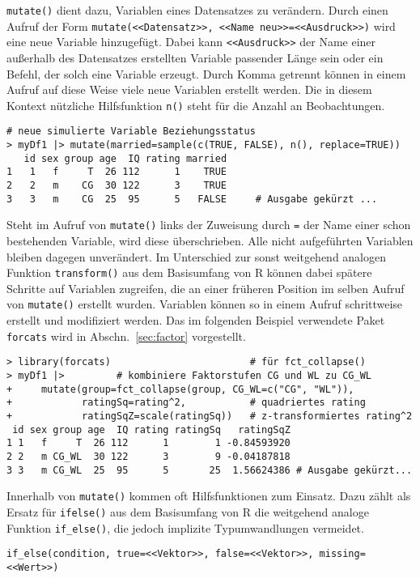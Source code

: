 \lstinline!mutate()! dient dazu, Variablen eines Datensatzes zu verändern. Durch einen Aufruf der Form \lstinline!mutate(<<Datensatz>>, <<Name neu>>=<<Ausdruck>>)! wird eine neue Variable hinzugefügt. Dabei kann \lstinline!<<Ausdruck>>! der Name einer außerhalb des Datensatzes erstellten Variable passender Länge sein oder ein Befehl, der solch eine Variable erzeugt. Durch Komma getrennt können in einem Aufruf auf diese Weise viele neue Variablen erstellt werden. Die in diesem Kontext nützliche Hilfsfunktion \lstinline!n()! steht für die Anzahl an Beobachtungen.
\begin{lstlisting}
# neue simulierte Variable Beziehungsstatus
> myDf1 |> mutate(married=sample(c(TRUE, FALSE), n(), replace=TRUE))
   id sex group age  IQ rating married
1   1   f     T  26 112      1    TRUE
2   2   m    CG  30 122      3    TRUE
3   3   m    CG  25  95      5   FALSE     # Ausgabe gekürzt ...
\end{lstlisting}

Steht im Aufruf von \lstinline!mutate()! links der Zuweisung durch \lstinline!=! der Name einer schon bestehenden Variable, wird diese überschrieben. Alle nicht aufgeführten Variablen bleiben dagegen unverändert. Im Unterschied zur sonst weitgehend analogen Funktion \lstinline!transform()! aus dem Basisumfang von R können dabei spätere Schritte auf Variablen zugreifen, die an einer früheren Position im selben Aufruf von \lstinline!mutate()! erstellt wurden. Variablen können so in einem Aufruf schrittweise erstellt und modifiziert werden. Das im folgenden Beispiel verwendete Paket \lstinline!forcats! wird in Abschn.\ \ref{sec:factor} vorgestellt.
\begin{lstlisting}
> library(forcats)                        # für fct_collapse()
> myDf1 |>         # kombiniere Faktorstufen CG und WL zu CG_WL
+     mutate(group=fct_collapse(group, CG_WL=c("CG", "WL")),
+            ratingSq=rating^2,           # quadriertes rating
+            ratingSqZ=scale(ratingSq))   # z-transformiertes rating^2
 id sex group age  IQ rating ratingSq   ratingSqZ
1 1   f     T  26 112      1        1 -0.84593920
2 2   m CG_WL  30 122      3        9 -0.04187818
3 3   m CG_WL  25  95      5       25  1.56624386 # Ausgabe gekürzt...
\end{lstlisting}

Innerhalb von \lstinline!mutate()! kommen oft Hilfsfunktionen zum Einsatz. Dazu zählt als Ersatz für \lstinline!ifelse()! aus dem Basisumfang von R die weitgehend analoge Funktion \lstinline!if_else()!, die jedoch implizite Typumwandlungen vermeidet.
\begin{lstlisting}
if_else(condition, true=<<Vektor>>, false=<<Vektor>>, missing=<<Wert>>)
\end{lstlisting}

